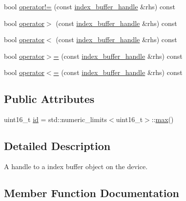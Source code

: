 \begin{DoxyCompactItemize}
\item 
bool \mbox{\hyperlink{structmoka_1_1index__buffer__handle_aabc5b64a1673341d50368446dc6840fd}{operator!=}} (const \mbox{\hyperlink{structmoka_1_1index__buffer__handle}{index\+\_\+buffer\+\_\+handle}} \&rhs) const
\item 
bool \mbox{\hyperlink{structmoka_1_1index__buffer__handle_a213d8badf6bc91e87f56ad65cbb1bc1c}{operator$>$}} (const \mbox{\hyperlink{structmoka_1_1index__buffer__handle}{index\+\_\+buffer\+\_\+handle}} \&rhs) const
\item 
bool \mbox{\hyperlink{structmoka_1_1index__buffer__handle_adfebe54fd84e937125f74e2a405eb030}{operator$<$}} (const \mbox{\hyperlink{structmoka_1_1index__buffer__handle}{index\+\_\+buffer\+\_\+handle}} \&rhs) const
\item 
bool \mbox{\hyperlink{structmoka_1_1index__buffer__handle_a8df77d2edae6e60e7a9abb325a56aa7f}{operator$>$=}} (const \mbox{\hyperlink{structmoka_1_1index__buffer__handle}{index\+\_\+buffer\+\_\+handle}} \&rhs) const
\item 
bool \mbox{\hyperlink{structmoka_1_1index__buffer__handle_afdd908565d55f85594f71ba090a8625e}{operator$<$=}} (const \mbox{\hyperlink{structmoka_1_1index__buffer__handle}{index\+\_\+buffer\+\_\+handle}} \&rhs) const
\end{DoxyCompactItemize}
\subsection*{Public Attributes}
\begin{DoxyCompactItemize}
\item 
uint16\+\_\+t \mbox{\hyperlink{structmoka_1_1index__buffer__handle_afd594c47ab1e6cdbc18565870bd2941e}{id}} = std\+::numeric\+\_\+limits$<$uint16\+\_\+t$>$\+::\mbox{\hyperlink{namespacemoka_acf03408f89c521244763fb5f8746ce16a2ffe4e77325d9a7152f7086ea7aa5114}{max}}()
\end{DoxyCompactItemize}


\subsection{Detailed Description}
A handle to a index buffer object on the device. 

\subsection{Member Function Documentation}
\mbox{\label{structmoka_1_1index__buffer__handle_aa2eecc2d1f6aa0cbbfc62daeb15a801b}} 
